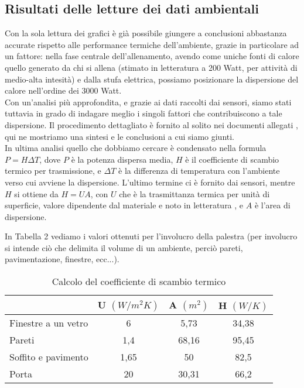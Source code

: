 \documentclass[fleqn,10pt]{SelfArx} %
\begin{document}
\subsection{Risultati delle letture dei dati ambientali}
Con la sola lettura dei grafici è già possibile giungere a conclusioni abbastanza accurate rispetto alle performance termiche 
dell'ambiente, grazie in particolare ad un fattore: nella fase centrale dell'allenamento, avendo come uniche fonti di calore 
quello generato da chi si allena (stimato in letteratura a 200 Watt, per attività di medio-alta intesità) e dalla stufa 
elettrica, possiamo posizionare la dispersione del calore nell'ordine dei 3000 Watt. \\
Con un'analisi più approfondita, e grazie ai dati raccolti dai sensori, siamo stati tuttavia in grado di indagare meglio i 
singoli fattori che contribuiscono a tale dispersione. Il procedimento dettagliato è fornito al solito nei documenti allegati \cite{ing_termo}, 
qui ne mostriamo una sintesi e le conclusioni a cui siamo giunti.\\

In ultima analisi quello che dobbiamo cercare è condensato nella formula $ P = H \Delta T $, dove $ P $ è la potenza dispersa 
media, $ H $ è il coefficiente di scambio termico per trasmissione, e $ \Delta T $ è la differenza di temperatura con l'ambiente 
verso cui avviene la dispersione. L'ultimo termine ci è fornito dai sensori, mentre $ H $ si ottiene da $ H = U A $, 
con $ U $ che è la trasmittanza termica per unità di superficie, valore dipendente dal materiale e noto in letteratura 
\cite{trasmittanza}, e $ A $ è l'area di dispersione.

In Tabella 2 vediamo i valori ottenuti per l'involucro della palestra (per involucro si intende ciò che delimita il volume di un 
ambiente, perciò pareti, pavimentazione, finestre, ecc...).

\begin{table}[hbt]
	\caption{Calcolo del coefficiente di scambio termico}
	\centering
	\begin{tabular}{lccc}
		\toprule
			 & \textbf{U} $ (W/m^2K) $ & \textbf{A} $ (m^2) $ & \textbf{H} $ (W/K) $ \\
		\midrule
		Finestre a un vetro & 6 & 5,73 & 34,38 \\
		Pareti & 1,4 & 68,16 & 95,45 \\
		Soffito e pavimento & 1,65 & 50 & 82,5 \\
		Porta & 20 & 30,31 & 66,2 \\
		\bottomrule
	\end{tabular}
	\label{tab:label}
\end{table}
\end{document}
